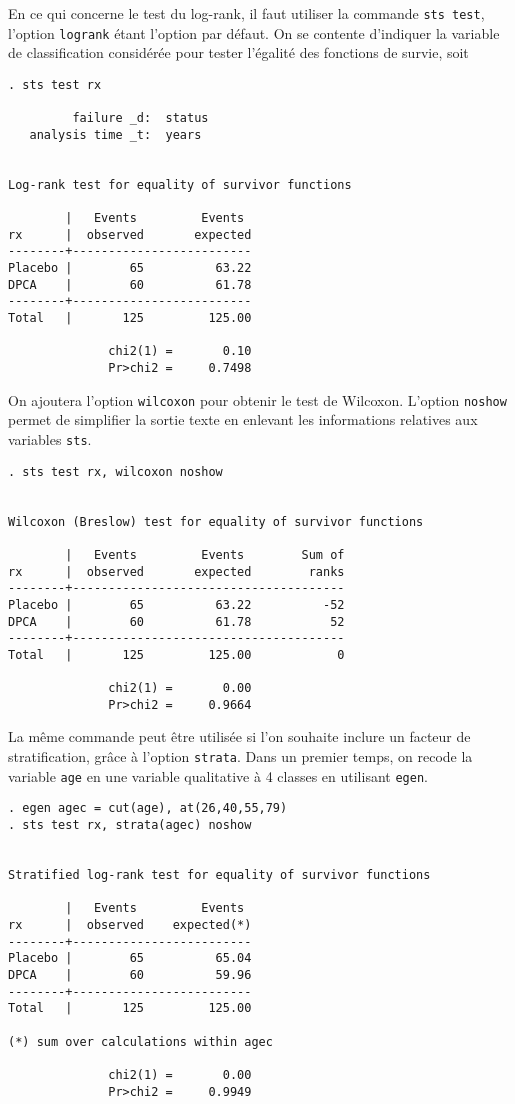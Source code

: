 En ce qui concerne le test du log-rank, il faut utiliser la commande
\verb|sts test|, l'option \verb|logrank| étant l'option par défaut. On se
contente d'indiquer la variable de classification considérée pour tester
l'égalité des fonctions de survie, soit
\begin{verbatim}
. sts test rx

         failure _d:  status
   analysis time _t:  years


Log-rank test for equality of survivor functions

        |   Events         Events
rx      |  observed       expected
--------+-------------------------
Placebo |        65          63.22
DPCA    |        60          61.78
--------+-------------------------
Total   |       125         125.00

              chi2(1) =       0.10
              Pr>chi2 =     0.7498
\end{verbatim}
On ajoutera l'option \verb|wilcoxon| pour obtenir le test de
Wilcoxon. L'option \verb|noshow| permet de simplifier la sortie texte en
enlevant les informations relatives aux variables \verb|sts|.
\begin{verbatim}
. sts test rx, wilcoxon noshow


Wilcoxon (Breslow) test for equality of survivor functions

        |   Events         Events        Sum of
rx      |  observed       expected        ranks
--------+--------------------------------------
Placebo |        65          63.22          -52
DPCA    |        60          61.78           52
--------+--------------------------------------
Total   |       125         125.00            0

              chi2(1) =       0.00
              Pr>chi2 =     0.9664
\end{verbatim}

La même commande peut être utilisée si l'on souhaite inclure un facteur de
stratification, grâce à l'option \verb|strata|. Dans un premier temps, on
recode la variable \texttt{age} en une variable qualitative à 4 classes en
utilisant \verb|egen|.
\begin{verbatim}
. egen agec = cut(age), at(26,40,55,79)
. sts test rx, strata(agec) noshow


Stratified log-rank test for equality of survivor functions

        |   Events         Events
rx      |  observed    expected(*)
--------+-------------------------
Placebo |        65          65.04
DPCA    |        60          59.96
--------+-------------------------
Total   |       125         125.00

(*) sum over calculations within agec

              chi2(1) =       0.00
              Pr>chi2 =     0.9949
\end{verbatim}

